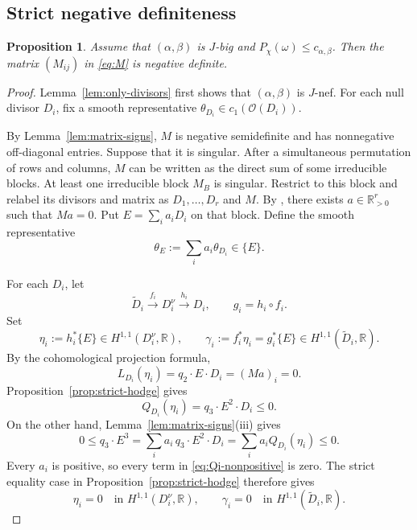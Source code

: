 \documentclass[reqno]{amsart}
\newcommand{\R}{\mathbb{R}}
\newcommand{\cab}{c_{\alpha,\beta}}
\newcommand{\cO}{\mathcal O}
\theoremstyle{plain}
\newtheorem{proposition}[thm]{Proposition}
\theoremstyle{remark}
\begin{document}
\subsection{Strict negative definiteness}
\begin{proposition}
    \label{prop:M-negative}
Assume that $(\alpha,\beta)$ is $J$-big and
$P_\chi(\omega)\leq\cab$. Then the matrix $(M_{ij})$ in
\eqref{eq:M} is negative definite.
\end{proposition}
\begin{proof}
Lemma~\ref{lem:only-divisors} first shows that $(\alpha,\beta)$ is
$J$-nef. For each null divisor $D_i$, fix a smooth representative
$\theta_{D_i}\in c_1(\cO(D_i))$.

By Lemma~\ref{lem:matrix-signs}, $M$ is negative semidefinite and
has nonnegative off-diagonal entries. Suppose that it is singular.
After a simultaneous permutation of rows and
columns, $M$ can be written as the direct sum of some irreducible blocks.
At least one irreducible block $M_B$ is singular. 
Restrict to this block and relabel its divisors and matrix as
$D_1,\ldots,D_r$ and $M$. By \cite[Lemma 10(ii)]{3d}, there exists $a\in \mathbb{R}_{>0}^r$ such that $Ma=0$.
Put $E=\sum_i a_iD_i$ on that block.
Define the smooth representative
\[
 \theta_E:=\sum_i a_i\theta_{D_i}\in\{E\}.
\]

For each $D_i$, let
\[
 \widetilde D_i\xrightarrow{\,f_i\,}D_i^\nu
 \xrightarrow{\,h_i\,}D_i,\qquad
 g_i=h_i\circ f_i.
\]
Set
\[
 \eta_i:=h_i^*\{E\}\in H^{1,1}(D_i^\nu,\R),
 \qquad
 \gamma_i:=f_i^*\eta_i=g_i^*\{E\}
 \in H^{1,1}(\widetilde D_i,\R).
\]
By the cohomological projection formula,
\[
 L_{D_i}(\eta_i)=q_2\cdot E\cdot D_i=(Ma)_i=0.
\]
Proposition~\ref{prop:strict-hodge} gives
\begin{equation}\label{eq:Qi-nonpositive}
 Q_{D_i}(\eta_i)=q_3\cdot E^2\cdot D_i\leq0.
\end{equation}
On the other hand, Lemma~\ref{lem:matrix-signs}\textup{(iii)} gives
\[
 0\leq q_3\cdot E^3
 =\sum_i a_i\,q_3\cdot E^2\cdot D_i
 =\sum_i a_iQ_{D_i}(\eta_i)\leq0.
\]
Every $a_i$ is positive, so every term in
\eqref{eq:Qi-nonpositive} is zero.  The strict equality case in
Proposition~\ref{prop:strict-hodge} therefore gives
\begin{equation}\label{eq:E-restriction-zero}
 \eta_i=0\quad\text{in }H^{1,1}(D_i^\nu,\R),
 \qquad
 \gamma_i=0\quad\text{in }H^{1,1}(\widetilde D_i,\R).
\end{equation}


\end{proof}
\end{document}
